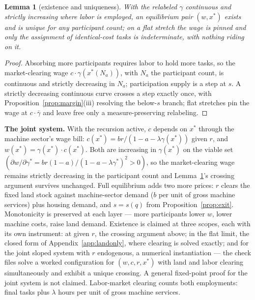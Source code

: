 \documentclass[12pt]{article}
\theoremstyle{plain}
\newtheorem{lemma}[proposition]{Lemma}
\begin{document}
\begin{lemma}[existence and uniqueness]\label{lem:existence}
With the relabeled $\gamma$ continuous and strictly increasing where labor is employed, an equilibrium pair $(w, x^*)$ exists and is unique for any participant count; on a flat stretch the wage is pinned and only the assignment of identical-cost tasks is indeterminate, with nothing riding on it.
\end{lemma}

\begin{proof}
Absorbing more participants requires labor to hold more tasks, so the market-clearing wage $c\cdot \gamma (x^*(N_a))$, with $N_a$ the participant count, is continuous and strictly decreasing in $N_a$; participation supply is a step at $s$. A strictly decreasing continuous curve crosses a step exactly once, with Proposition~\ref{prop:margin}(iii) resolving the below-$s$ branch; flat stretches pin the wage at $c\cdot \bar{\gamma}$ and leave free only a measure-preserving relabeling.
\end{proof}

\textbf{The joint system.} With the recursion active, $c$ depends on $x^*$ through the machine sector's wage bill: $c(x^*) = br/(1 - a - \lambda \gamma (x^*))$ given $r$, and $w(x^*) = \gamma (x^*)\cdot c(x^*)$. Both are increasing in $\gamma (x^*)$ on the viable set $(\partial w/\partial \gamma ^* = br(1-a)/(1-a-\lambda \gamma ^*)^2 > 0)$, so the market-clearing wage remains strictly decreasing in the participant count and Lemma~\ref{lem:existence}'s crossing argument survives unchanged. Full equilibrium adds two more prices: $r$ clears the fixed land stock against machine-sector demand ($b$ per unit of gross machine services) plus housing demand, and $s = s(q)$ from Proposition~\ref{prop:exit}. Monotonicity is preserved at each layer --- more participants lower $w$, lower machine costs, raise land demand. Existence is claimed at three scopes, each with its own instrument: at given $r$, the crossing argument above; in the flat limit, the closed form of Appendix~\ref{app:landonly}, where clearing is solved exactly; and for the joint sloped system with $r$ endogenous, a numerical instantiation --- the check files solve a worked configuration for $(w, c, r, x^*)$ with land and labor clearing simultaneously and exhibit a unique crossing. A general fixed-point proof for the joint system is not claimed. Labor-market clearing counts both employments: final tasks plus $\lambda$ hours per unit of gross machine services.
\end{document}
